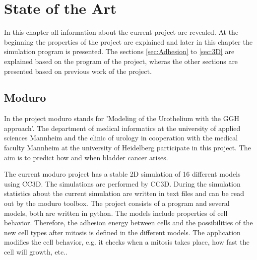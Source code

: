 \chapter{State of the Art}
In this chapter all information about the current project are revealed. At the beginning the properties of the project are explained and later in this chapter the simulation program is presented. The sections \ref{sec:Adhesion} to \ref{sec:3D} are explained based on the program of the project, wheras the other sections are presented based on previous work of the project.

\section{Moduro}
In the project moduro stands for 'Modeling of the Urothelium with the \ac{GGH} approach'. \newline
The department of medical informatics at the university of applied sciences Mannheim and the clinic of urology in cooperation with the medical faculty Mannheim at the university of Heidelberg participate in this project. The aim is to predict how and when bladder cancer arises.

The current moduro project has a stable 2D simulation of 16 different models using \ac{CC3D}. The simulations are performed by \ac{CC3D}. During the simulation statistics about the current simulation are written in text files and can be read out by the moduro toolbox. \newline
The project consists  of a program and several models, both are written in python. The models include properties of cell behavior. Therefore, the adhesion energy between cells and the possibilities of the new cell types after mitosis is defined in the different models. The application modifies the cell behavior, e.g. it checks when a mitosis takes place, how fast the cell will growth, etc.. 

